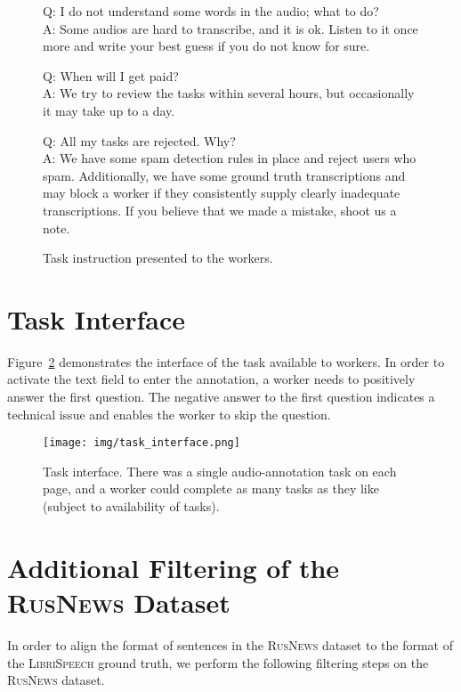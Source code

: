 \documentclass{article}
\newcommand{\libri}{\textsc{LibriSpeech}}
\newcommand{\news}{\textsc{RusNews}}
\begin{document}
\begin{figure}[htbp]
{{\smallskip

Q: I do not understand some words in the audio; what to do?\\
A: Some audios are hard to transcribe, and it is ok. Listen to it once more and write your best guess if you do not know for sure.

\smallskip

Q: When will I get paid?\\
A: We try to review the tasks within several hours, but occasionally it may take up to a day.

\smallskip

Q: All my tasks are rejected. Why?\\
A: We have some spam detection rules in place and reject users who spam. Additionally, we have some ground truth transcriptions and may block a worker if they consistently supply clearly inadequate transcriptions. If you believe that we made a mistake, shoot us a note.
 }}
  \caption{Task instruction presented to the workers.}
  \label{fig:instruction}
\end{figure}

\newpage

\section{Task Interface}
\label{section:screenshot}

Figure~\ref{fig:task_interface} demonstrates the interface of the task available to workers. In order to activate the text field to enter the 
annotation, a worker needs to positively answer the first question. The negative answer to the first question indicates a technical issue and enables the worker to skip the question.

\begin{figure}[h]
    \centering
    \texttt{[image: img/task\_interface.png]}
    \caption{Task interface. There was a single audio-annotation task on each page, and a worker could complete as many tasks as they like (subject to availability of tasks).}
    \label{fig:task_interface}
\end{figure}

\section{Additional Filtering of the \news{} Dataset}
\label{section:filtering}

In order to align the format of sentences in the \news{} dataset to the format of the \libri{} ground truth, we perform the following filtering steps on the \news{} dataset.
\end{document}
